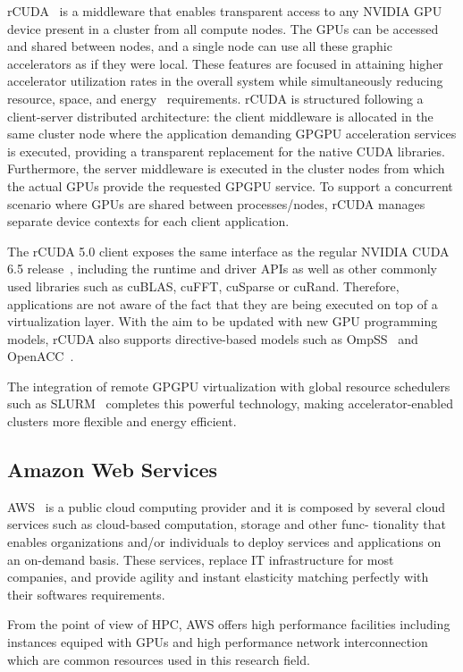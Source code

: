 \documentclass[a4paper,twoside]{article}
\begin{document}
{rCUDA}~\cite{tonithesis,toniparco} is a middleware that enables transparent access
to any NVIDIA GPU device present in a cluster from all compute
nodes. The GPUs can be accessed and shared between nodes, and a single node can use all these graphic accelerators
as if they were local.
These features are focused in attaining higher accelerator utilization rates in the overall system while simultaneously reducing
resource, space, and energy~\cite{energy14} requirements.
rCUDA is structured following a client-server distributed
architecture: the client middleware is allocated in the same cluster node where the application demanding GPGPU
acceleration services is executed, providing a transparent replacement for the
native CUDA libraries. Furthermore, the server middleware is executed in the
cluster nodes from which the actual GPUs provide the requested GPGPU service.
To support a concurrent scenario where GPUs are shared between
processes\slash nodes, {rCUDA} manages separate device contexts for
each client application.

The {rCUDA} 5.0 client exposes the same interface as the regular NVIDIA
CUDA 6.5 release~\cite{cuda65}, including the runtime and driver
APIs as well as other commonly used libraries such as cuBLAS, cuFFT, cuSparse or cuRand.
Therefore, applications are not aware of the fact that they are being executed
on top of a virtualization layer.
With the aim to be updated with new GPU programming models, {rCUDA} also supports
directive-based models such as OmpSS~\cite{repara15} and OpenACC~\cite{cluster15}.

The integration of remote GPGPU virtualization with global
resource schedulers such as SLURM~\cite{sbacpad14} completes this powerful
technology, making accelerator-enabled clusters more flexible and
energy efficient.

\subsection{Amazon Web Services}
\label{sec:aws}
AWS~\cite{aws} is a public cloud computing provider
and it is composed by several cloud services such as 
 cloud-based computation, storage and other func-
tionality that enables organizations and/or individuals to deploy
services and applications on an on-demand basis. 
These services, replace IT infrastructure for most companies, and provide agility and instant elasticity matching 
perfectly with their softwares requirements.

From the point of view of HPC, AWS offers high performance facilities including 
instances equiped with GPUs and high performance network interconnection which 
are common resources used in this research field.
\end{document}
